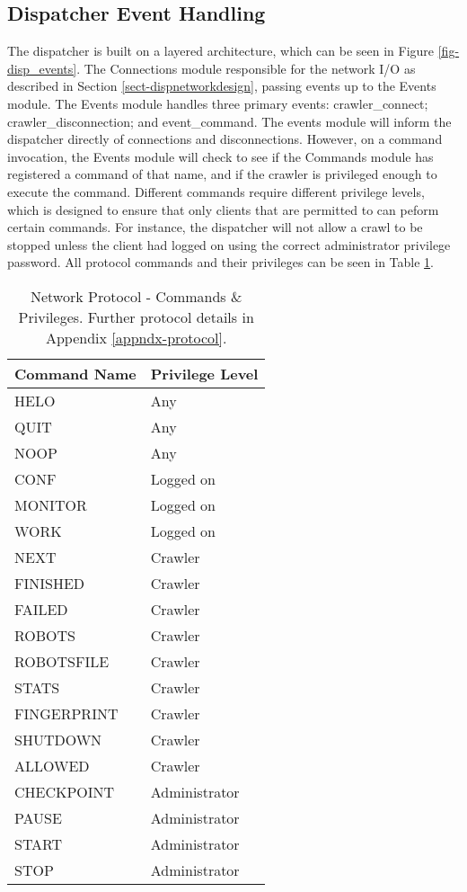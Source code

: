 \subsection{Dispatcher Event Handling}\label{sect-dispevents}
The dispatcher is built on a layered architecture, which can be seen in Figure \ref{fig-disp_events}. The Connections module responsible for the network I/O as described in Section \ref{sect-dispnetworkdesign}, passing events up to the Events module. The Events module handles three primary events: crawler\_connect; crawler\_disconnection; and event\_command. The events module will inform the dispatcher directly of connections and disconnections. However, on a command invocation, the Events module will check to see if the Commands module has registered a command of that name, and if the crawler is privileged enough to execute the command. Different commands require different privilege levels, which is designed to ensure that only clients that are permitted to can peform certain commands. For instance, the dispatcher will not allow a crawl to be stopped unless the client had logged on using the correct administrator privilege password. All protocol commands and their privileges can be seen in Table \ref{tbl-commands}.\\
\begin{table}
\begin{center}
\begin{tabular}{|l|l|}
\hline
\bf{Command Name} & \bf{Privilege Level} \\
\hline
HELO & Any \\
\hline
QUIT & Any \\
\hline
NOOP & Any \\
\hline
CONF & Logged on \\
\hline
MONITOR & Logged on \\
\hline
WORK & Logged on \\
\hline
NEXT & Crawler \\
\hline
FINISHED & Crawler \\
\hline
FAILED & Crawler \\
\hline
ROBOTS & Crawler \\
\hline
ROBOTSFILE & Crawler \\
\hline
STATS & Crawler \\
\hline
FINGERPRINT & Crawler \\
\hline
SHUTDOWN & Crawler \\
\hline
ALLOWED & Crawler \\
\hline
CHECKPOINT & Administrator \\
\hline
PAUSE & Administrator \\
\hline
START & Administrator \\
\hline
STOP & Administrator \\
\hline
\end{tabular}
\caption{Network Protocol - Commands \& Privileges. Further protocol details in Appendix \ref{appndx-protocol}.} \label{tbl-commands}
\end{center}
\end{table}

